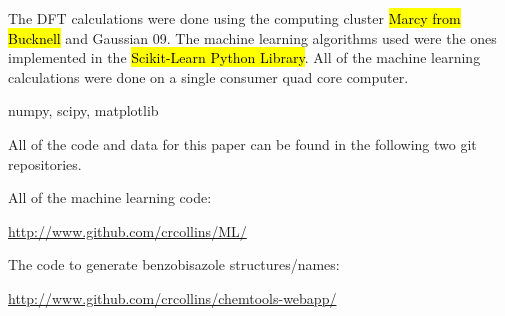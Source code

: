 \documentclass[10pt]{article}
\begin{document}
The DFT calculations were done using the computing cluster \hl{Marcy from Bucknell} and Gaussian 09. The machine learning algorithms used were the ones implemented in the \hl{Scikit-Learn Python Library}. All of the machine learning calculations were done on a single consumer quad core computer.

numpy, scipy, matplotlib

All of the code and data for this paper can be found in the following two git repositories.

All of the machine learning code:

\url{http://www.github.com/crcollins/ML/}

The code to generate benzobisazole structures/names:

\url{http://www.github.com/crcollins/chemtools-webapp/}
\end{document}
